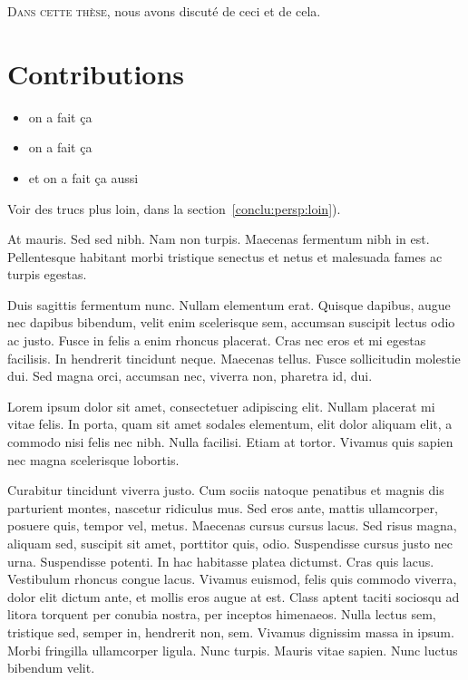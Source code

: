 \label{chap:conclusion}
\introformatting

\lettrine{D}{ans cette thèse}, nous avons discuté de ceci et de cela.

\section{Contributions}

\begin{itemize}
  \item on a fait ça
  \item on a fait ça
  \item et on a fait ça aussi
\end{itemize}

Voir des trucs plus loin, dans la section~\ref{conclu:persp:loin}).

At mauris. Sed sed nibh. Nam non turpis. Maecenas fermentum nibh in est.
Pellentesque habitant morbi tristique senectus et netus et malesuada fames ac
turpis egestas.

Duis sagittis fermentum nunc. Nullam elementum erat. Quisque dapibus, augue nec
dapibus bibendum, velit enim scelerisque sem, accumsan suscipit lectus odio ac
justo. Fusce in felis a enim rhoncus placerat. Cras nec eros et mi egestas
facilisis. In hendrerit tincidunt neque. Maecenas tellus. Fusce sollicitudin
molestie dui. Sed magna orci, accumsan nec, viverra non, pharetra id, dui.

Lorem ipsum dolor sit amet, consectetuer adipiscing elit. Nullam placerat mi
vitae felis. In porta, quam sit amet sodales elementum, elit dolor aliquam elit,
a commodo nisi felis nec nibh. Nulla facilisi. Etiam at tortor. Vivamus quis
sapien nec magna scelerisque lobortis.

Curabitur tincidunt viverra justo. Cum sociis natoque penatibus et magnis dis
parturient montes, nascetur ridiculus mus. Sed eros ante, mattis ullamcorper,
posuere quis, tempor vel, metus. Maecenas cursus cursus lacus. Sed risus magna,
aliquam sed, suscipit sit amet, porttitor quis, odio. Suspendisse cursus justo
nec urna. Suspendisse potenti. In hac habitasse platea dictumst. Cras quis
lacus. Vestibulum rhoncus congue lacus. Vivamus euismod, felis quis commodo
viverra, dolor elit dictum ante, et mollis eros augue at est. Class aptent
taciti sociosqu ad litora torquent per conubia nostra, per inceptos himenaeos.
Nulla lectus sem, tristique sed, semper in, hendrerit non, sem. Vivamus
dignissim massa in ipsum. Morbi fringilla ullamcorper ligula. Nunc turpis.
Mauris vitae sapien. Nunc luctus bibendum velit.

